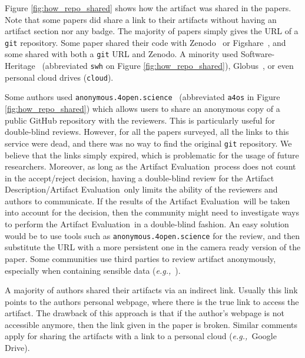 \documentclass[sigconf,natbib=false]{acmart}
\newcommand{\eg}{\emph{e.g.,}}
\newcommand{\ad}{Artifact Description}
\newcommand{\aeval}{Artifact Evaluation}
\newcommand{\adae}{\ad/\aeval}
\begin{document}
Figure \ref{fig:how_repo_shared} shows how the artifact was shared in the papers.
Note that some papers did share a link to their artifacts without having an artifact section nor any badge.
The majority of papers simply gives the URL of a \texttt{git} repository.
Some paper shared their code with Zenodo\ \cite{zenodo} or Figshare\ \cite{figshare}, and some shared with both a \texttt{git} URL and Zenodo.
A minority used Software-Heritage\ \cite{swheritage} (abbreviated \texttt{swh} on Figure \ref{fig:how_repo_shared}), Globus\ \cite{globus}, or even personal cloud drives (\texttt{cloud}).

Some authors used \texttt{anonymous.4open.science}\ \cite{anonymous_github} (abbreviated \texttt{a4os} in Figure \ref{fig:how_repo_shared}) which allows users to share an anonymous copy of a public GitHub repository with the reviewers.
This is particularly useful for double-blind reviews.
However, for all the papers surveyed, all the links to this service were dead, and there was no way to find the original \texttt{git} repository.
We believe that the links simply expired, which is problematic for the usage of future researchers.
Moreover, as long as the \aeval\ process does not count in the accept/reject decision, having a double-blind review for the \adae\ only limits the ability of the reviewers and authors to communicate.
If the results of the \aeval\ will be taken into account for the decision, then the community might need to investigate ways to perform the \aeval\ in a double-blind fashion.
An easy solution would be to use tools such as \texttt{anonymous.4open.science} \cite{anonymous_github} for the review, and then substitute the URL with a more persistent one in the camera ready version of the paper.
Some communities use third parties to review artifact anonymously, especially when containing sensible data (\eg\ \cite{perignon2019certify}).

A majority of authors shared their artifacts via an indirect link.
Usually this link points to the authors personal webpage, where there is the true link to access the artifact.
The drawback of this approach is that if the author's webpage is not accessible anymore, then the link given in the paper is broken.
Similar comments apply for sharing the artifacts with a link to a personal cloud (\eg\ Google Drive).
\end{document}
